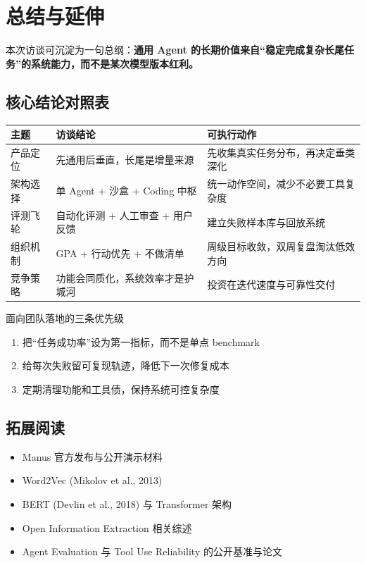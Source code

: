 \section{总结与延伸}

本次访谈可沉淀为一句总纲：\textbf{通用 Agent 的长期价值来自“稳定完成复杂长尾任务”的系统能力，而不是某次模型版本红利。}

\subsection{核心结论对照表}

\begin{center}
\begin{tabular}{p{3.4cm}p{5.1cm}p{5.3cm}}
\toprule
主题 & 访谈结论 & 可执行动作 \\
\midrule
产品定位 & 先通用后垂直，长尾是增量来源 & 先收集真实任务分布，再决定垂类深化 \\
架构选择 & 单 Agent + 沙盒 + Coding 中枢 & 统一动作空间，减少不必要工具复杂度 \\
评测飞轮 & 自动化评测 + 人工审查 + 用户反馈 & 建立失败样本库与回放系统 \\
组织机制 & GPA + 行动优先 + 不做清单 & 周级目标收敛，双周复盘淘汰低效方向 \\
竞争策略 & 功能会同质化，系统效率才是护城河 & 投资在迭代速度与可靠性交付 \\
\bottomrule
\end{tabular}
\end{center}

\begin{importantbox}{面向团队落地的三条优先级}
\begin{enumerate}
    \item 把“任务成功率”设为第一指标，而不是单点 benchmark
    \item 给每次失败留可复现轨迹，降低下一次修复成本
    \item 定期清理功能和工具债，保持系统可控复杂度
\end{enumerate}
\end{importantbox}

\subsection{拓展阅读}

\begin{itemize}
    \item Manus 官方发布与公开演示材料
    \item Word2Vec (Mikolov et al., 2013)
    \item BERT (Devlin et al., 2018) 与 Transformer 架构
    \item Open Information Extraction 相关综述
    \item Agent Evaluation 与 Tool Use Reliability 的公开基准与论文
\end{itemize}



